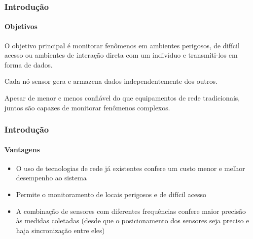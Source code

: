 \documentclass[notes]{beamer}
\begin{document}
\begin{frame}
\label{slide_7}
\frametitle{Introdução}
\framesubtitle{Objetivos}

\begin{block}

O objetivo principal é monitorar fenômenos em ambientes perigosos, de difícil acesso ou ambientes de interação direta com um indivíduo e transmiti-los em forma de dados. 
\end{block} \pause

\begin{block}

Cada nó sensor gera e armazena dados independentemente dos outros.

\end{block} \pause

\begin{block}

Apesar de menor e menos confiável do que equipamentos de rede tradicionais, juntos são capazes de monitorar fenômenos complexos. 

\end{block}

\end{frame}

\begin{frame}
\label{slide_8}
\frametitle{Introdução}
\framesubtitle{Vantagens}

\begin{block}

\begin{itemize}

\item O uso de tecnologias de rede já existentes confere um custo menor e melhor desempenho ao sistema \pause

\item Permite o monitoramento de locais perigosos e de difícil acesso \pause

\item A combinação de sensores com diferentes frequências confere maior precisão às medidas coletadas (desde que o posicionamento dos sensores seja preciso e haja sincronização entre eles) 

\end{itemize}

\end{block}

\end{frame}
\end{document}
